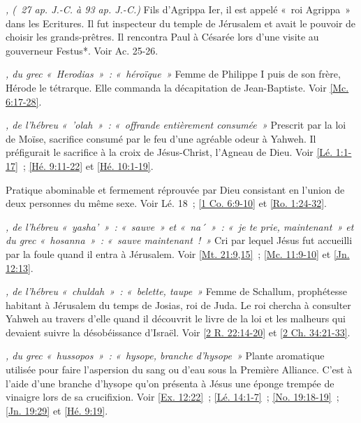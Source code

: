 \begin{multicols}{2}
\textit{, (\ 27 ap. J.-C. à 93 ap. J.-C.)}\newline
Fils d'Agrippa Ier, il est appelé «~roi Agrippa~» dans les Ecritures. Il fut inspecteur du temple de Jérusalem et avait le pouvoir de choisir les grands-prêtres. Il rencontra Paul à Césarée lors d'une visite au gouverneur Festus*. Voir Ac. 25-26.

\textit{, du grec «~Herodias~»~: «~héroïque~»}\newline
Femme de Philippe I puis de son frère, Hérode le tétrarque. Elle commanda la décapitation de Jean-Baptiste. Voir \vref{Mc. 6:17-28}.

\textit{, de l'hébreu «~'olah~»~: «~offrande entièrement consumée~»}\newline
Prescrit par la loi de Moïse, sacrifice consumé par le feu d'une agréable odeur à Yahweh. Il préfigurait le sacrifice à la croix de Jésus-Christ, l'Agneau de Dieu. Voir \vref{Lé. 1:1-17}~; \vref{Hé. 9:11-22} et \vref{Hé. 10:1-19}.

\textit{}\newline
Pratique abominable et fermement réprouvée par Dieu consistant en l'union de deux personnes du même sexe. Voir Lé. 18~; \vref{1 Co. 6:9-10} et \vref{Ro. 1:24-32}.

\textit{, de l'hébreu «~yasha'~»~: «~sauve~» et «~na´~»~: «~je te prie, maintenant~» et du grec «~hosanna~»~: «~sauve maintenant~!~»}\newline
Cri par lequel Jésus fut accueilli par la foule quand il entra à Jérusalem. Voir \vref{Mt. 21:9,15}~; \vref{Mc. 11:9-10} et \vref{Jn. 12:13}.

\textit{, de l'hébreu «~chuldah~»~: «~belette, taupe~»}\newline
Femme de Schallum, prophétesse habitant à Jérusalem du temps de Josias, roi de Juda. Le roi chercha à consulter Yahweh au travers d'elle quand il découvrit le livre de la loi et les malheurs qui devaient suivre la désobéissance d'Israël. Voir \vref{2 R. 22:14-20} et \vref{2 Ch. 34:21-33}.

\textit{, du grec «~hussopos~»~: «~hysope, branche d'hysope~»}\newline
Plante aromatique utilisée pour faire l'aspersion du sang ou d'eau sous la Première Alliance. C'est à l'aide d'une branche d'hysope qu'on présenta à Jésus une éponge trempée de vinaigre lors de sa crucifixion. Voir \vref{Ex. 12:22}~; \vref{Lé. 14:1-7}~; \vref{No. 19:18-19}~; \vref{Jn. 19:29} et \vref{Hé. 9:19}.


\end{multicols}
